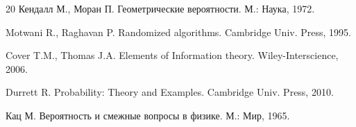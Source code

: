 \begin{thebibliography} {20}
Кендалл М., Моран П. Геометрические вероятности. М.: Наука, 1972.

Motwani R., Raghavan P. Randomized algorithms. Cambridge Univ. Press, 1995.

Cover T.M., Thomas J.A. Elements of Information theory. Wiley-Interscience, 2006. 

Durrett R. Probability: Theory and Examples. Cambridge Univ. Press, 2010.

Кац М. Вероятность и смежные вопросы в физике. М.: Мир, 1965.


\end{thebibliography}


